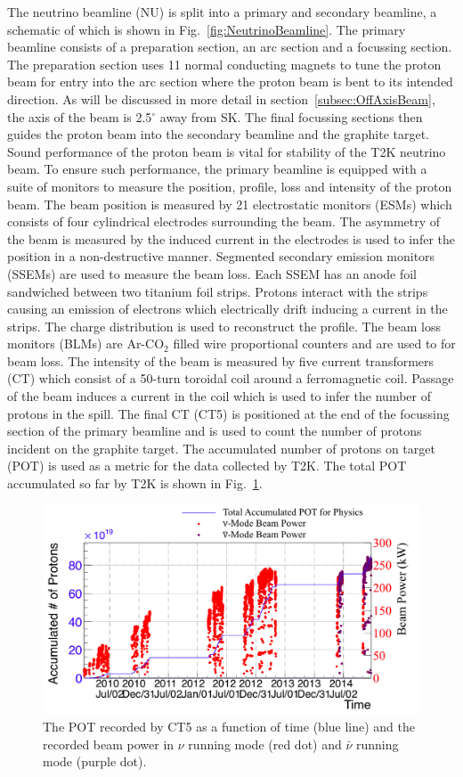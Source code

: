 The neutrino beamline (NU) is split into a primary and secondary beamline, a schematic of which is shown in Fig.~\ref{fig:NeutrinoBeamline}.  The primary beamline consists of a preparation section, an arc section and a focussing section.  The preparation section uses 11 normal conducting magnets to tune the proton beam for entry into the arc section where the proton beam is bent to its intended direction.  As will be discussed in more detail in section~\ref{subsec:OffAxisBeam}, the axis of the beam is 2.5$^\circ$ away from SK.  The final focussing sections then guides the proton beam into the secondary beamline and the graphite target.
\newline
Sound performance of the proton beam is vital for stability of the T2K neutrino beam.  To ensure such performance, the primary beamline is equipped with a suite of monitors to measure the position, profile, loss and intensity of the proton beam.  The beam position is measured by 21 electrostatic monitors (ESMs) which consists of four cylindrical electrodes surrounding the beam.  The asymmetry of the beam is measured by the induced current in the electrodes is used to infer the position in a non-destructive manner.  Segmented secondary emission monitors (SSEMs) are used to measure the beam loss.  Each SSEM has an anode foil sandwiched between two titanium foil strips.  Protons interact with the strips causing an emission of electrons which electrically drift inducing a current in the strips.  The charge distribution is used to reconstruct the profile.  The beam loss monitors (BLMs) are Ar-CO$_2$ filled wire proportional counters and are used to for beam loss.  The intensity of the beam is measured by five current transformers (CT) which consist of a 50-turn toroidal coil around a ferromagnetic coil.  Passage of the beam induces a current in the coil which is used to infer the number of protons in the spill.  The final CT (CT5) is positioned at the end of the focussing section of the primary beamline and is used to count the number of protons incident on the graphite target.  The accumulated number of protons on target (POT) is used as a metric for the data collected by T2K.  The total POT accumulated so far by T2K is shown in Fig.~\ref{fig:POTHistory}.
\begin{figure}
  \centering
  \includegraphics[width=15cm]{images/t2k/pot_history.png}
  \caption{The POT recorded by CT5 as a function of time (blue line) and the recorded beam power in $\nu$ running mode (red dot) and $\bar{\nu}$ running mode (purple dot).}
  \label{fig:POTHistory}
\end{figure}
